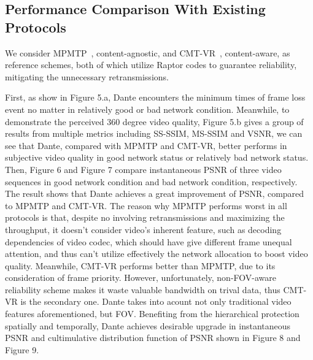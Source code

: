\subsection{Performance Comparison With Existing Protocols}
We consider MPMTP~\cite{MPMTP}, content-agnostic, and CMT-VR~\cite{CMT-VR}, content-aware,  as reference schemes, both of which utilize Raptor codes to guarantee reliability, mitigating the unnecessary retransmissions.	

First, as show in Figure 5.a, Dante encounters the minimum times of frame loss event no matter in relatively good or bad network condition. Meanwhile, to demonstrate the perceived 360 degree video quality, Figure 5.b gives a group of results from multiple metrics including SS-SSIM, MS-SSIM and VSNR, we can see that Dante, compared with MPMTP and CMT-VR, better performs in subjective video quality in good network status or relatively bad network status.     
Then, Figure 6 and Figure 7 compare instantaneous PSNR of three video sequences in good network condition and bad network condition, respectively. The result shows that Dante achieves a great improvement of PSNR, compared to MPMTP and CMT-VR. The reason why MPMTP performs worst in all protocols is that, despite no involving retransmissions and maximizing the throughput, it doesn't consider video's inherent feature, such as decoding dependencies of video codec, which should have give different frame unequal attention, and thus can't utilize effectively the network allocation to boost video quality. Meanwhile, CMT-VR performs better than MPMTP, due to its consideration of frame priority. However, unfortunately, non-FOV-aware reliability scheme makes it waste valuable bandwidth on trival data, thus CMT-VR is the secondary one. Dante takes into acount not only traditional video features aforementioned, but FOV. Benefiting from the hierarchical protection spatially and temporally, Dante achieves desirable upgrade in instantaneous PSNR and cultimulative distribution function of PSNR shown in Figure 8 and Figure 9.  	         
